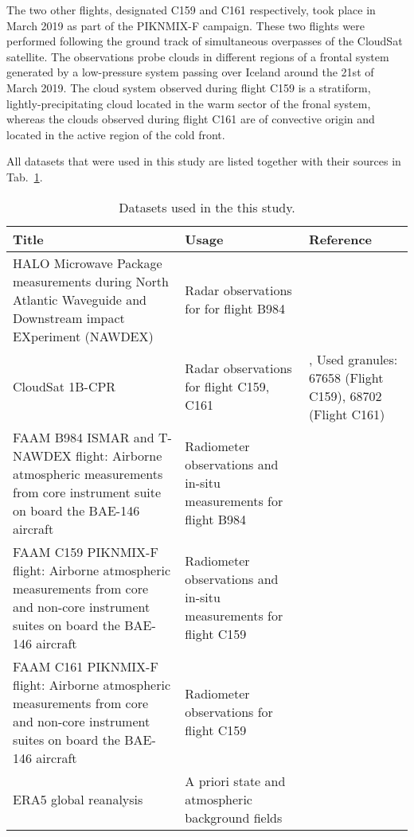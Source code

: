 \documentclass[journal abbreviation, manuscript]{copernicus}
\begin{document}
The two other flights, designated C159 and C161 respectively, took place in
March 2019 as part of the PIKNMIX-F campaign. These two flights were performed
following the ground track of simultaneous overpasses of the CloudSat satellite.
The observations probe clouds in different regions of a frontal system generated
by a low-pressure system passing over Iceland around the 21st of March 2019. The
cloud system observed during flight C159 is a stratiform, lightly-precipitating
cloud located in the warm sector of the fronal system, whereas the clouds
observed during flight C161 are of convective origin and located in the active
region of the cold front.

All datasets  that were used in this study are listed together with their
sources in Tab.~\ref{tab:data}.

\begin{table}
  \centering
  \caption{Datasets used in the this study.}
  \begin{tabular}{p{5cm}|p{5cm}|p{3cm}}
     Title &  Usage &  Reference \\
    \hline
    \hline

    HALO Microwave Package measurements during North Atlantic Waveguide and
    Downstream impact EXperiment (NAWDEX)
    & Radar observations for for flight B984
    & \citet{hamp_nawdex} \\
    \hline

    CloudSat 1B-CPR
    & Radar observations for flight C159, C161
    &  \citet{tanelli08}, Used granules: 67658 (Flight C159), 68702 (Flight C161)  \\
    \hline

    FAAM B984 ISMAR and T-NAWDEX flight: Airborne atmospheric measurements from
    core instrument suite on board the BAE-146 aircraft
    & Radiometer observations and in-situ measurements for flight B984
    & \citet{faam_nawdex_obs} \\
    \hline

  FAAM C159 PIKNMIX-F flight: Airborne atmospheric measurements from core and
  non-core instrument suites on board the BAE-146 aircraft
  & Radiometer observations and in-situ measurements for flight C159
  & \citet{faam_c159_obs} \\
    \hline

  FAAM C161 PIKNMIX-F flight: Airborne atmospheric measurements from core and
  non-core instrument suites on board the BAE-146 aircraft
    & Radiometer observations for flight C159
    & \citet{faam_c161_obs} \\
    \hline 

    ERA5 global reanalysis
    & A priori state and atmospheric background fields
    & \citet{era5}
  \end{tabular}
  \label{tab:data}
\end{table}
\end{document}
